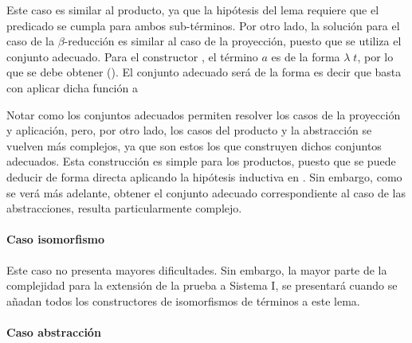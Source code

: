 \documentclass[]{report}
\begin{document}
	Este caso es similar al producto, ya que la hipótesis del lema requiere que el predicado se cumpla para ambos sub-términos.
	Por otro lado, la solución para el caso de la $\beta$-reducción es similar al caso de la proyección, puesto que se utiliza el conjunto adecuado.
	Para el constructor , el término $a$ es de la forma $\lambda\; t$, por lo que se debe obtener
	\snstar(\AgdaFunction{[}\AgdaFunction{]}).
	El conjunto adecuado 
	será de la forma
	\snstar{}\AgdaSpace{}%
	\AgdaSpace{}%
	\snstar
	\AgdaSymbol{(}\AgdaSpace{}%
	\AgdaSpace{}%
	\AgdaSpace{}%
	\AgdaSymbol{(}\AgdaSpace{}%
	\AgdaSpace{}%
	\AgdaSymbol{)}\AgdaSpace{}%
	\AgdaSpace{}%
	\AgdaSymbol{)}
	es decir que basta con aplicar dicha función a 
	
	
	Notar como los conjuntos adecuados permiten resolver los casos de la proyección y aplicación, pero, por otro lado, los casos del producto y la abstracción se vuelven más complejos, ya que son estos los que construyen dichos conjuntos adecuados.
	Esta construcción es simple para los productos, puesto que se puede deducir de forma directa aplicando la hipótesis inductiva en .	
	Sin embargo, como se verá más adelante, obtener el conjunto adecuado correspondiente al caso de las abstracciones, resulta particularmente complejo.
	
	\paragraph{Caso isomorfismo}
	
	Este caso no presenta mayores dificultades. Sin embargo, la mayor parte de la complejidad para la extensión de la prueba a Sistema I, se presentará cuando se añadan todos los constructores de isomorfismos de términos a este lema.
	
	
	\paragraph{Caso abstracción}
	
\end{document}

